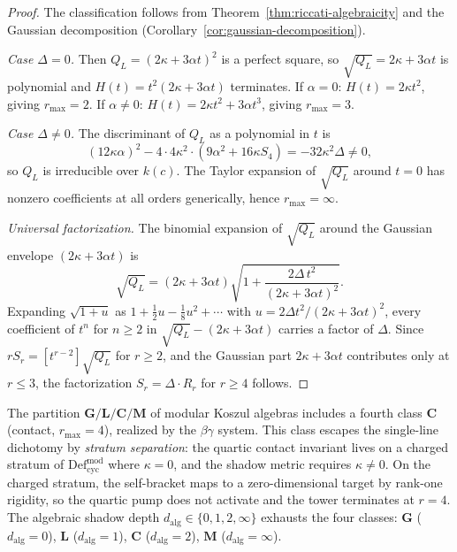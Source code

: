 \begin{proof}
The classification follows from Theorem~\ref{thm:riccati-algebraicity}
and the Gaussian decomposition
(Corollary~\ref{cor:gaussian-decomposition}).

\emph{Case $\Delta = 0$.}
Then $Q_L = (2\kappa + 3\alpha t)^2$ is a perfect square, so
$\sqrt{Q_L} = 2\kappa + 3\alpha t$ is polynomial and
$H(t) = t^2(2\kappa + 3\alpha t)$ terminates.
If $\alpha = 0$: $H(t) = 2\kappa t^2$, giving $r_{\max} = 2$.
If $\alpha \neq 0$: $H(t) = 2\kappa t^2 + 3\alpha t^3$,
giving $r_{\max} = 3$.

\emph{Case $\Delta \neq 0$.}
The discriminant of $Q_L$ as a polynomial in $t$ is
\[
 (12\kappa\alpha)^2 - 4 \cdot 4\kappa^2 \cdot
 (9\alpha^2 + 16\kappa S_4) = -32\kappa^2\Delta \neq 0,
\]
so $Q_L$ is irreducible over $k(c)$. The Taylor expansion
of $\sqrt{Q_L}$ around $t = 0$ has nonzero coefficients at
all orders generically, hence $r_{\max} = \infty$.

\emph{Universal factorization.}
The binomial expansion of $\sqrt{Q_L}$ around the Gaussian
envelope $(2\kappa + 3\alpha t)$ is
\[
 \sqrt{Q_L} = (2\kappa + 3\alpha t)\sqrt{1 + \frac{2\Delta\,t^2}
 {(2\kappa + 3\alpha t)^2}}.
\]
Expanding $\sqrt{1 + u}$ as $1 + \tfrac{1}{2}u - \tfrac{1}{8}u^2
+ \cdots$ with $u = 2\Delta t^2/(2\kappa + 3\alpha t)^2$,
every coefficient of $t^n$ for $n \geq 2$ in
$\sqrt{Q_L} - (2\kappa + 3\alpha t)$ carries a factor of
$\Delta$. Since $rS_r = [t^{r-2}]\sqrt{Q_L}$ for $r \geq 2$,
and the Gaussian part $2\kappa + 3\alpha t$ contributes only
at $r \leq 3$, the factorization $S_r = \Delta \cdot R_r$
for $r \geq 4$ follows.
\end{proof}

\begin{remark}
\label{rem:contact-class}
The partition $\mathbf{G}/\mathbf{L}/\mathbf{C}/\mathbf{M}$
of modular Koszul algebras includes a fourth class $\mathbf{C}$
(contact, $r_{\max} = 4$), realized by the $\beta\gamma$ system.
This class escapes the single-line dichotomy by \emph{stratum
separation}: the quartic contact invariant lives on a charged
stratum of $\mathrm{Def}_{\mathrm{cyc}}^{\mathrm{mod}}$ where
$\kappa = 0$, and the shadow metric requires $\kappa \neq 0$.
On the charged stratum, the self-bracket maps to a zero-dimensional
target by rank-one rigidity, so the quartic pump does not activate
and the tower terminates at $r = 4$. The algebraic shadow depth
$d_{\mathrm{alg}} \in \{0, 1, 2, \infty\}$ exhausts the four
classes: $\mathbf{G}$ ($d_{\mathrm{alg}} = 0$),
$\mathbf{L}$ ($d_{\mathrm{alg}} = 1$),
$\mathbf{C}$ ($d_{\mathrm{alg}} = 2$),
$\mathbf{M}$ ($d_{\mathrm{alg}} = \infty$).
\end{remark}

